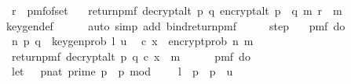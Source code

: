 \begin{isabellebody}
\ \ r\ {\isasymleftarrow}\ pmf{\isacharunderscore}{\kern0pt}of{\isacharunderscore}{\kern0pt}set\ {\isasymZ}{\isacharsemicolon}{\kern0pt}\isanewline
\ \ return{\isacharunderscore}{\kern0pt}pmf\ {\isacharparenleft}{\kern0pt}decrypt{\isacharunderscore}{\kern0pt}alt\ p\ q\ {\isacharparenleft}{\kern0pt}encrypt{\isacharunderscore}{\kern0pt}alt\ {\isacharparenleft}{\kern0pt}p\ {\isacharasterisk}{\kern0pt}\ q{\isacharparenright}{\kern0pt}\ m\ r{\isacharparenright}{\kern0pt}\ {\isacharequal}{\kern0pt}\ m{\isacharparenright}{\kern0pt}{\isacharbraceright}{\kern0pt}{\isachardoublequoteclose}\ \isanewline
\ \ \ \ \isamarkupfalse%
\ key{\isacharunderscore}{\kern0pt}gen{\isacharunderscore}{\kern0pt}def\isanewline
\ \ \ \ \isamarkupfalse%
\ {\isacharparenleft}{\kern0pt}auto\ simp\ add{\isacharcolon}{\kern0pt}\ bind{\isacharunderscore}{\kern0pt}return{\isacharunderscore}{\kern0pt}pmf{\isacharparenright}{\kern0pt}\isanewline
\isanewline
\ \ \isamarkupfalse%
\ \isamarkupfalse%
\ step{\isacharunderscore}{\kern0pt}{}{\isacharcolon}{\kern0pt}\ {\isachardoublequoteopen}\isanewline
\ \ pmf\ {\isacharparenleft}{\kern0pt}do\ {\isacharbraceleft}{\kern0pt}\isanewline
\ \ {\isacharparenleft}{\kern0pt}n{\isacharcomma}{\kern0pt}\ {\isacharparenleft}{\kern0pt}p{\isacharcomma}{\kern0pt}\ q{\isacharparenright}{\kern0pt}{\isacharparenright}{\kern0pt}\ {\isasymleftarrow}\ key{\isacharunderscore}{\kern0pt}gen{\isacharunderscore}{\kern0pt}prob\ l\ u{\isacharsemicolon}{\kern0pt}\isanewline
\ \ {\isacharparenleft}{\kern0pt}c{\isacharcomma}{\kern0pt}\ x{\isacharparenright}{\kern0pt}\ {\isasymleftarrow}\ {\isacharparenleft}{\kern0pt}encrypt{\isacharunderscore}{\kern0pt}prob\ n\ m{\isacharparenright}{\kern0pt}{\isacharsemicolon}{\kern0pt}\isanewline
\ \ return{\isacharunderscore}{\kern0pt}pmf\ {\isacharparenleft}{\kern0pt}decrypt{\isacharunderscore}{\kern0pt}alt\ p\ q\ {\isacharparenleft}{\kern0pt}c{\isacharcomma}{\kern0pt}\ x{\isacharparenright}{\kern0pt}\ {\isacharequal}{\kern0pt}\ m{\isacharparenright}{\kern0pt}{\isacharbraceright}{\kern0pt}{\isacharparenright}{\kern0pt}\isanewline
\ \ {\isacharequal}{\kern0pt}\ \isanewline
\ \ pmf\ {\isacharparenleft}{\kern0pt}do\ {\isacharbraceleft}{\kern0pt}\isanewline
\ \ let\ {\isasymK}\ {\isacharequal}{\kern0pt}\ {\isacharbraceleft}{\kern0pt}{\isacharparenleft}{\kern0pt}p{\isacharcolon}{\kern0pt}{\isacharcolon}{\kern0pt}nat{\isacharparenright}{\kern0pt}{\isachardot}{\kern0pt}\ prime\ p\ {\isasymand}\ p\ mod\ {}\ {\isacharequal}{\kern0pt}\ {}\ {\isasymand}\ l\ {\isasymle}\ p\ {\isasymand}\ p\ {\isasymle}\ u{\isacharbraceright}{\kern0pt}{\isacharsemicolon}{\kern0pt}\isanewline

\end{isabellebody}
